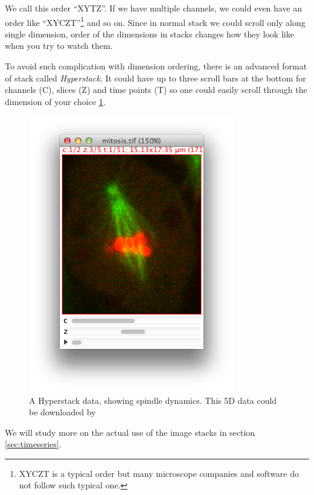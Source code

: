 We call this order ``XYTZ''. If we have multiple channels, we could even have an order like ``XYCZT''\footnote{XYCZT is a typical order but many microscope companies and software do not follow such typical one.} and so on. Since in normal stack we could scroll only along single dimension, order of the dimensions in stacks changes how they look like when you try to watch them. 

To avoid such complication with dimension ordering, there is an advanced format of stack called \textit{Hyperstack}. It could have up to three scroll bars at the bottom for channels (C), slices (Z) and time points (T) so one could easily scroll through the dimension of your choice \ref{fig:heyperstack_mitosis}. 

\begin{figure}[h!]
\begin{center}
\includegraphics[width=9cm]{fig/Hyperstack_Mitosis.png}
\caption{ A Hyperstack data, showing spindle dynamics. This 5D data could be downloaded by }
\label{fig:heyperstack_mitosis}
\end{center}
\end{figure}

We will study more on the actual use of the image stacks in section \ref{sec:timeseries}.

